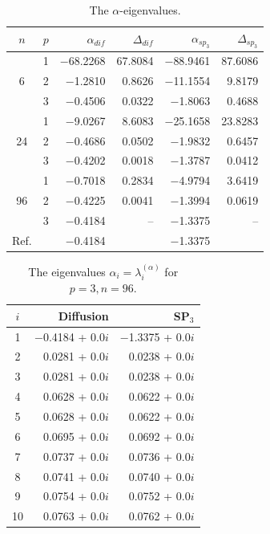 \documentclass[authoryear]{elsarticle}
\begin{document}
\begin{table}[h]
\caption{The $\alpha$-eigenvalues.}
\label{tab:iaea_with_alpha_del}
\begin{center}
\begin{tabular}{c c r r r r}
\hline
$n$ & $p$ & $\alpha_{dif}$ & $\Delta_{dif}$ &$\alpha_{sp_3}$& $\Delta_{sp_3}$ \\
\hline
	& 1	&$-$68.2268 &67.8084& $-$88.9461 &87.6086\\
6	& 2	& $-$1.2810 & 0.8626& $-$11.1554 & 9.8179\\
	& 3	& $-$0.4506 & 0.0322&  $-$1.8063 & 0.4688\\ 
\hline
	& 1	& $-$9.0267  & 8.6083&$-$25.1658 &23.8283\\
24& 2	& $-$0.4686  & 0.0502& $-$1.9832 & 0.6457\\
	& 3	& $-$0.4202  & 0.0018& $-$1.3787 & 0.0412\\ 
\hline
	& 1	& $-$0.7018  & 0.2834& $-$4.9794 & 3.6419\\
96& 2	& $-$0.4225  & 0.0041& $-$1.3994 & 0.0619\\
	& 3	& $-$0.4184  &    -- & $-$1.3375 &    --\\ 
\hline
Ref.& & $-$0.4184 & & $-$1.3375 \\ 
\hline
\end{tabular}
\end{center}
\end{table}

\begin{table}[h]
\caption{The eigenvalues $\alpha_i=\lambda_i^{(\alpha)}$ for $p=3, n=96$.}
\label{tab:iaea_with_alpha_del_10}
\begin{center}
\begin{tabular}{c r r}
\hline
$i$ & Diffusion & SP$_3$ \\
\hline
1& $-$0.4184 + 0.0$i$&$-$1.3375 + 0.0$i$\\
2& 0.0281 + 0.0$i$&0.0238 + 0.0$i$\\
3& 0.0281 + 0.0$i$&0.0238 + 0.0$i$\\
4& 0.0628 + 0.0$i$&0.0622 + 0.0$i$\\
5& 0.0628 + 0.0$i$&0.0622 + 0.0$i$\\
6& 0.0695 + 0.0$i$&0.0692 + 0.0$i$\\
7& 0.0737 + 0.0$i$&0.0736 + 0.0$i$\\
8& 0.0741 + 0.0$i$&0.0740 + 0.0$i$\\
9& 0.0754 + 0.0$i$&0.0752 + 0.0$i$\\
10& 0.0763 + 0.0$i$&0.0762 + 0.0$i$\\
\hline
\end{tabular}
\end{center}
\end{table}
\end{document}
